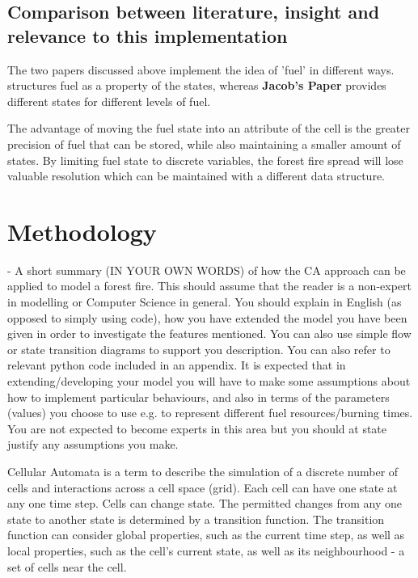 \documentclass[11pt, a4paper, titlepage]{article}
\begin{document}
  \subsection{Comparison between literature, insight and relevance to this implementation}
  The two papers discussed above implement the idea of 'fuel' in different ways. \cite{ALEXANDRIDIS2008191} structures fuel as a property of the states, whereas \textbf{Jacob's Paper} provides different states for different levels of fuel. 
  
  The advantage of moving the fuel state into an attribute of the cell is the greater precision of fuel that can be stored, while also maintaining a smaller amount of states. By limiting fuel state to discrete variables, the forest fire spread will lose valuable resolution which can be maintained with a different data structure.

\section{Methodology}
\begin{displayquote}
  - A short summary (IN YOUR OWN WORDS) of how the CA approach can
  be applied to model a forest fire. This should assume that the reader is a non-expert in modelling or
  Computer Science in general. You should explain in English (as opposed to simply using code), how
  you have extended the model you have been given in order to investigate the features mentioned.
  You can also use simple flow or state transition diagrams to support you description. You can also
  refer to relevant python code included in an appendix.
  It is expected that in extending/developing your model you will have to make some assumptions
  about how to implement particular behaviours, and also in terms of the parameters (values) you
  choose to use e.g. to represent different fuel resources/burning times. You are not expected to
  become experts in this area but you should at state justify any assumptions you make.
\end{displayquote} 

Cellular Automata is a term to describe the simulation of a discrete number of cells and interactions across a cell space (grid). Each cell can have one state at any one time step. Cells can change state. The permitted changes from any one state to another state is determined by a transition function. The transition function can consider global properties, such as the current time step, as well as local properties, such as the cell's current state, as well as its neighbourhood - a set of cells near the cell. 
\end{document}
